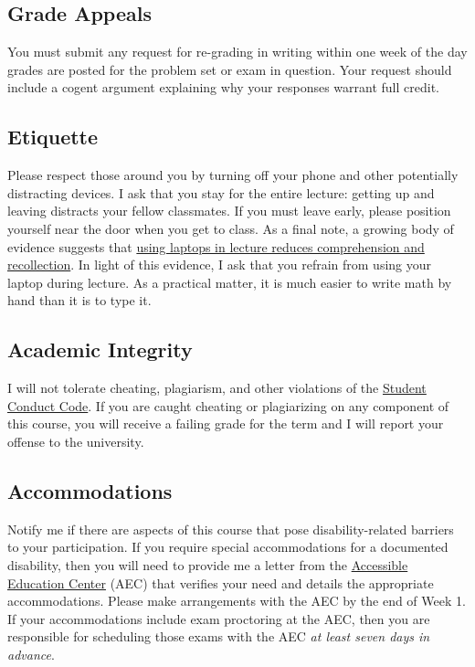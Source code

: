 \documentclass[10pt]{article}
\begin{document}
\subsection*{Grade Appeals} 

You must submit any request for re-grading in writing within one week of the day grades are posted for the problem set or exam in question. Your request should include a cogent argument explaining why your responses warrant full credit.

\subsection*{Etiquette} 

Please respect those around you by turning off your phone and other potentially distracting devices. 
I ask that you stay for the entire lecture: getting up and leaving distracts your fellow classmates. 
If you must leave early, please position yourself near the door when you get to class. 
As a final note, a growing body of evidence suggests that \href{https://www.theverge.com/2017/11/27/16703904/laptop-learning-lecture}{using laptops in lecture reduces comprehension and recollection}. In light of this evidence, I ask that you refrain from using your laptop during lecture. 
As a practical matter, it is much easier to write math by hand than it is to type it. 

\subsection*{Academic Integrity} 

I will not tolerate cheating, plagiarism, and other violations of the \href{https://studentlife.uoregon.edu/conduct}{Student Conduct Code}. If you are caught cheating or plagiarizing on any component of this course, you will receive a failing grade for the term and I will report your offense to the university. 

\subsection*{Accommodations} 

Notify me if there are aspects of this course that pose disability-related barriers to your participation. If you require special accommodations for a documented disability, then you will need to provide me a letter from the \href{https://aec.uoregon.edu/}{Accessible Education Center} (AEC) that verifies your need and details the appropriate accommodations. Please make arrangements with the AEC by the end of Week 1. If your accommodations include exam proctoring at the AEC, then you are responsible for scheduling those exams with the AEC \textit{at least seven days in advance}.
\end{document}
